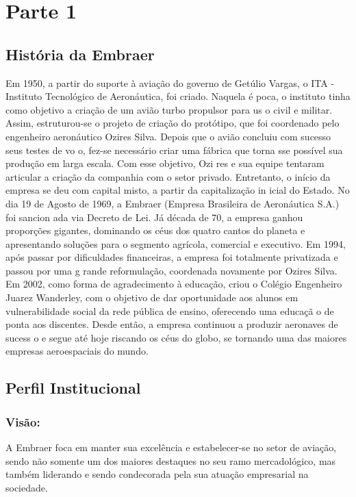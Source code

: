 
\chapter{Parte 1}

\section{História da Embraer}
Em 1950, a partir do suporte à aviação do governo de Getúlio
Vargas, o ITA - Instituto Tecnológico de Aeronáutica, foi criado. Naquela é
poca, o instituto tinha como objetivo a criação de um avião turbo propulsor para us
o civil e militar. Assim, estruturou-se o projeto de criação do protótipo, que foi coordenado 
pelo engenheiro aeronáutico Ozires Silva. Depois que o avião concluiu com sucesso seus testes de vo
o, fez-se necessário criar uma fábrica que torna
sse possível sua produção em larga escala. 
Com esse objetivo, Ozi
res e sua equipe tentaram articular a criação da companhia com 
o  setor privado. Entretanto, o início da empresa se deu com capital misto, a partir da capitalização in
icial do Estado. No dia 19 de Agosto de 1969, a Embraer (Empresa Brasileira de Aeronáutica S.A.) foi sancion
ada via Decreto de Lei. Já década de 70, a empresa ganhou proporções gigantes, dominando os céus dos quatro cantos
do planeta e apresentando soluções para o segmento agrícola, comercial e executivo.
Em 1994, após passar por 
dificuldades financeiras, a empresa foi
totalmente privatizada e passou por uma g
rande reformulação, coordenada novamente por Ozires
Silva. Em 2002, como forma de agradecimento à educação, criou o 
Colégio Engenheiro Juarez Wanderley, com o objetivo de dar oportunidade aos 
alunos em vulnerabilidade social da rede pública de ensino, oferecendo uma educaçã
o de ponta aos discentes. Desde então, a empresa continuou a produzir aeronaves de sucess
o e segue até hoje riscando os céus do globo, se tornando uma das maiores empresas aeroespaciais do mundo.



\section{Perfil Institucional}

\subsection{Visão:}
	A Embraer foca em manter sua excelência e estabelecer-se no setor de aviação, sendo não somente um dos maiores destaques no seu ramo mercadológico, mas também liderando e sendo condecorada pela sua atuação empresarial na sociedade.
	
